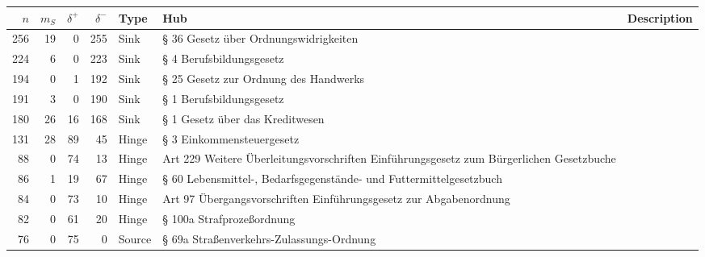 \begin{tabular}{rrrrlp{}p{}}
\hline
   $n$ &   $m_S$ &   $\delta^+$ &   $\delta^-$ & \textbf{Type}   & \textbf{Hub}                                                                            & \textbf{Description}   \\
\hline
   256 &      19 &            0 &          255 & Sink            & § 36 Gesetz über Ordnungswidrigkeiten                                                   &                        \\
   224 &       6 &            0 &          223 & Sink            & § 4 Berufsbildungsgesetz                                                                &                        \\
   194 &       0 &            1 &          192 & Sink            & § 25 Gesetz zur Ordnung des Handwerks                                                   &                        \\
   191 &       3 &            0 &          190 & Sink            & § 1 Berufsbildungsgesetz                                                                &                        \\
   180 &      26 &           16 &          168 & Sink            & § 1 Gesetz über das Kreditwesen                                                         &                        \\
   131 &      28 &           89 &           45 & Hinge           & § 3 Einkommensteuergesetz                                                               &                        \\
    88 &       0 &           74 &           13 & Hinge           & Art 229 Weitere Überleitungsvorschriften Einführungsgesetz zum Bürgerlichen Gesetzbuche &                        \\
    86 &       1 &           19 &           67 & Hinge           & § 60 Lebensmittel-, Bedarfsgegenstände- und Futtermittelgesetzbuch                      &                        \\
    84 &       0 &           73 &           10 & Hinge           & Art 97 Übergangsvorschriften Einführungsgesetz zur Abgabenordnung                       &                        \\
    82 &       0 &           61 &           20 & Hinge           & § 100a Strafprozeßordnung                                                               &                        \\
    76 &       0 &           75 &            0 & Source          & § 69a Straßenverkehrs-Zulassungs-Ordnung                                                &                        \\

\end{tabular}
